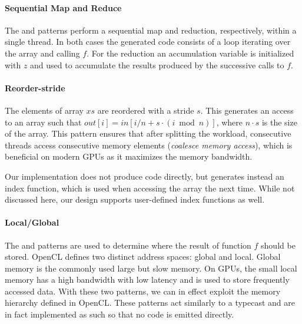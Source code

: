 


\paragraph{Sequential Map and Reduce}
The  and  patterns perform a sequential map and reduction, respectively, within a single thread.
In both cases the generated code consists of a loop iterating over the array and calling $f$.
For the reduction an accumulation variable is initialized with $z$ and used to accumulate the results produced by the successive calls to $f$.

\paragraph{Reorder-stride}
The elements of array $xs$ are reordered with a stride $s$.
This generates an access to an array such that $out[i] = in[i / n + s \cdot (i \bmod{n})]$, where $n\cdot s$ is the size of the array.
This pattern ensures that after splitting the workload, consecutive threads access consecutive memory elements (\ie \emph{coalesce memory access}), which is beneficial on modern GPUs as it maximizes the memory bandwidth.

Our implementation does not produce code directly, but generates instead an index function, which is used when accessing the array the next time.
While not discussed here, our design supports user-defined index functions as well.

\paragraph{Local/Global}
The  and  patterns are used to determine where the result of function $f$ should be stored.
OpenCL defines two distinct address spaces: global and local.
Global memory is the commonly used large but slow memory.
On GPUs, the small local memory has a high bandwidth with low latency and is used to store frequently accessed data.
With these two patterns, we can in effect exploit the memory hierarchy defined in OpenCL.
These patterns act similarly to a typecast and are in fact implemented as such so that no code is emitted directly.

